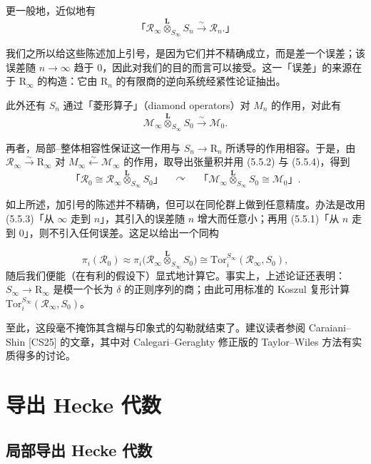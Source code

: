 更一般地，近似地有
\begin{equation}\tag{5.5.3}\label{eq:a6-04-3}
\text{「}\mathcal R_\infty\overset{\mathbf L}{\otimes}_{S_\infty}S_n\xrightarrow{\sim}\mathcal R_n.\text{」}
\end{equation}

我们之所以给这些陈述加上引号，是因为它们并不精确成立，而是差一个误差；该误差随 $n\to\infty$ 趋于 $0$，因此对我们的目的而言可以接受。这一「误差」的来源在于 $\mathrm R_\infty$ 的构造：它由 $\mathrm R_n$ 的有限商的逆向系统经紧性论证抽出。

此外还有 $S_n$ 通过「菱形算子」（diamond operators）对 $M_n$ 的作用，对此有
\begin{equation}\tag{5.5.4}\label{eq:a6-04-4}
\mathcal M_\infty\overset{\mathbf L}{\otimes}_{S_\infty}S_0\xrightarrow{\sim}\mathcal M_0.
\end{equation}

再者，局部–整体相容性保证这一作用与 $S_n\to\mathrm R_n$ 所诱导的作用相容。于是，由 $\mathcal R_\infty\xrightarrow{\sim}\mathrm R_\infty$ 对 $M_\infty\xleftarrow{\sim}\mathcal M_\infty$ 的作用，取导出张量积并用 (5.5.2) 与 (5.5.4)，得到
\[
\text{「}\mathcal R_0\cong\mathcal R_\infty\overset{\mathbf L}{\otimes}_{S_\infty}S_0\text{」}
\quad\curvearrowright\quad
\text{「}\mathcal M_\infty\overset{\mathbf L}{\otimes}_{S_\infty}S_0\cong\mathcal M_0\text{」}.
\]

如上所述，加引号的陈述并不精确，但可以在同伦群上做到任意精度。办法是改用 (5.5.3)「从 $\infty$ 走到 $n$」，其引入的误差随 $n$ 增大而任意小；再用 (5.5.1)「从 $n$ 走到 $0$」，则不引入任何误差。这足以给出一个同构


\[
\pi_i(\mathcal R_0)\approx\pi_i\bigl(\mathcal R_\infty\overset{\mathbf L}{\otimes}_{S_\infty}S_0\bigr)\cong\mathrm{Tor}^{S_\infty}_i(\mathcal R_\infty,S_0),
\]
随后我们便能（在有利的假设下）显式地计算它。事实上，上述论证还表明：$S_\infty\to\mathrm R_\infty$ 是模一个长为 $\delta$ 的正则序列的商；由此可用标准的 Koszul 复形计算 $\mathrm{Tor}^{S_\infty}_i(\mathcal R_\infty,S_0)$。

至此，这段毫不掩饰其含糊与印象式的勾勒就结束了。建议读者参阅 Caraiani–Shin [CS25] 的文章，其中对 Calegari–Geraghty 修正版的 Taylor–Wiles 方法有实质得多的讨论。

\section{导出 Hecke 代数}

\subsection{局部导出 Hecke 代数}

